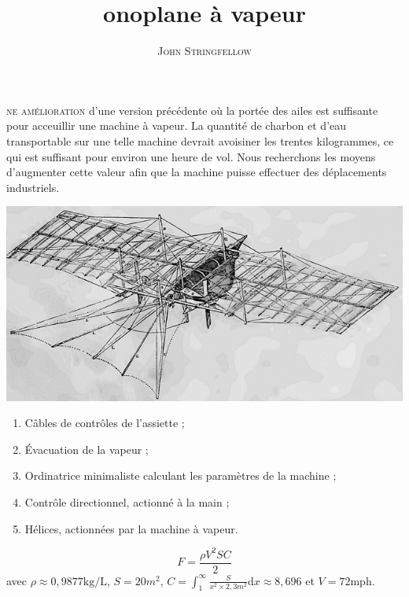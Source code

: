 

\title{onoplane à vapeur}
\author{\textsc{John Stringfellow}}
\date{}



\maketitle

\lettrine{}{ne amélioration} d’une version précédente où la portée des ailes est suffisante pour acceuillir une machine à vapeur.
La quantité de charbon et d’eau transportable sur une telle machine devrait avoisiner les trentes kilogrammes, ce qui est suffisant pour environ une heure de vol.
Nous recherchons les moyens d’augmenter cette valeur afin que la machine puisse effectuer des déplacements industriels.

\begin{center}
	\includegraphics[width = 18cm]{engin.png}
\end{center}

\begin{enumerate}[A]
	\item Câbles de contrôles de l’assiette ;
	\item Évacuation de la vapeur ;
	\item Ordinatrice minimaliste calculant les paramètres de la machine ;
	\item Contrôle directionnel, actionné à la main ;
	\item Hélices, actionnées par la machine à vapeur.
\end{enumerate}

\[
	F = \frac{\rho V^2 S C}{2}
\]
avec $\rho \approx 0,9877 \mathrm{kg/L}$, $S = 20m^2$, $C = \displaystyle\int_1^\infty\! \frac{S}{x^2 \times 2,3m^2}\mathrm{d}x \approx 8,696$ et $V = 72 \mathrm{mph}$.



